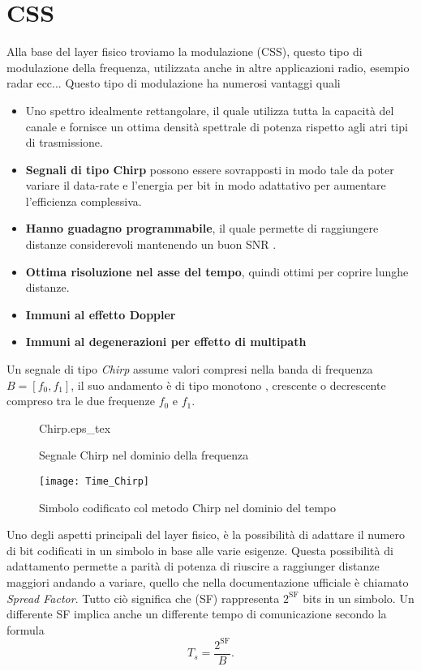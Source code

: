 \section{CSS}
Alla base del layer fisico troviamo la modulazione (CSS), questo tipo di
modulazione della frequenza, utilizzata anche in altre applicazioni radio, 
esempio radar ecc...
Questo tipo di modulazione ha numerosi vantaggi quali 
\begin{itemize}
\item Uno spettro idealmente rettangolare, il quale utilizza tutta la capacità
del canale e fornisce un ottima densità spettrale di potenza rispetto agli atri
tipi di trasmissione.
\item \textbf{Segnali di tipo Chirp} possono essere sovrapposti in modo tale da
poter variare il data-rate e l'energia per bit in modo adattativo per aumentare
l'efficienza complessiva.
\item \textbf{Hanno guadagno programmabile}, il quale permette di raggiungere
distanze considerevoli mantenendo un buon SNR .
\item  \textbf{Ottima risoluzione nel asse del tempo}, quindi ottimi per coprire
lunghe distanze.
\item \textbf{Immuni al effetto Doppler} 
\item \textbf{Immuni al degenerazioni per effetto di multipath} 
\end{itemize}
Un segnale di tipo \emph{Chirp} assume valori compresi nella banda di frequenza
$B = [f_0,f_1]$, il suo andamento è di tipo monotono , crescente o decrescente
compreso tra le due frequenze $f_0$ e $f_1$.

\begin{figure}[h]
\centering 
{Chirp.eps_tex}
\caption{Segnale Chirp nel dominio della frequenza}
\end{figure}


\begin{figure}[h]
\centering 
\texttt{[image: Time\_Chirp]}
\caption{Simbolo codificato col metodo Chirp nel dominio del tempo}
\end{figure}

Uno degli aspetti principali del layer fisico, è la possibilità di adattare il
numero di bit codificati in un simbolo in base alle varie esigenze. Questa
possibilità di adattamento permette a parità di potenza di
riuscire a raggiunger distanze maggiori andando a variare, quello che nella
documentazione ufficiale è chiamato \emph{Spread Factor}. Tutto ciò significa
che (SF) rappresenta $2^{\text{SF}}$ bits in un simbolo. Un differente SF
implica anche un differente tempo di comunicazione secondo la formula
\begin{equation}
        T_s=\frac{2^{\text{SF}}}{B}.
\end{equation}


